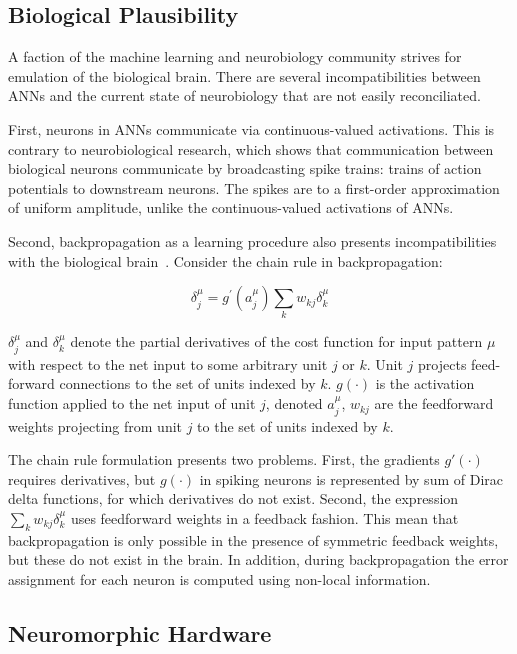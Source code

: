 \documentclass[fyp]{socreport}
\begin{document}
\subsection{Biological Plausibility\label{bioplausible}}

A faction of the machine learning and neurobiology community strives for
emulation of the biological brain. There are several incompatibilities between
ANNs and the current state of neurobiology that are not easily reconciliated.

First, neurons in ANNs communicate via continuous-valued activations.  This is
contrary to neurobiological research, which shows that communication between
biological neurons communicate by broadcasting spike trains: trains of action
potentials to downstream neurons. The spikes are to a first-order approximation
of uniform amplitude, unlike the continuous-valued activations of ANNs.

Second, backpropagation as a learning procedure also presents incompatibilities
with the biological brain~\cite{TAVANAEI201947}.  Consider the chain rule in
backpropagation:

\begin{equation} \label{chainrule} \delta_{j}^{\mu}=g^{\prime}\left(a_{j}^{\mu}\right) \sum_{k} w_{k j} \delta_{k}^{\mu}
\end{equation}

\(\delta_{j}^{\mu}\) and \(\delta_{k}^{\mu}\) denote the partial derivatives of
the cost function for input pattern \(\mu\) with respect to the net input to
some arbitrary unit \(j\) or \(k\). Unit \(j\) projects feed-forward connections
to the set of units indexed by \(k\).  \(g(\cdot)\) is the activation function
applied to the net input of unit \(j\), denoted \(a_j^{\mu}\), \(w_{kj}\) are
the feedforward weights projecting from unit \(j\) to the set of units indexed
by \(k\).

The chain rule formulation presents two problems. First, the gradients
\(g'(\cdot)\) requires derivatives, but \(g(\cdot)\) in spiking neurons is
represented by sum of Dirac delta functions, for which derivatives do not
exist. Second, the expression \(\sum_{k} w_{k j} \delta_{k}^{\mu}\) uses
feedforward weights in a feedback fashion. This mean that backpropagation is
only possible in the presence of symmetric feedback weights, but these do not
exist in the brain. In addition, during backpropagation the error assignment for
each neuron is computed using non-local information.

\subsection{Neuromorphic Hardware\label{neuromorphic}}
\end{document}
